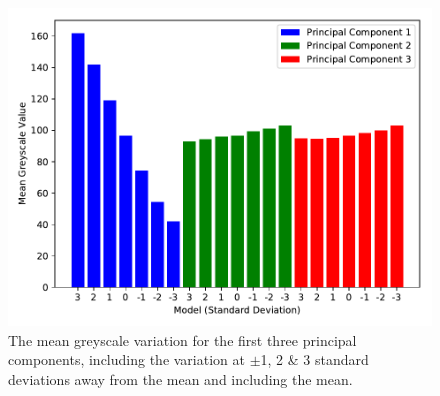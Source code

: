 \begin{figure}[h]
  \centering
  \includegraphics[width=.9\textwidth]{Chapters/Chapter_PCA_images/pca_gs.pdf}
  \caption{The mean greyscale variation for the first three principal components, including the variation at $\pm$1, 2 \& 3 standard deviations away from the mean and including the mean.}
  \label{fig:pca_gs}
\end{figure}

